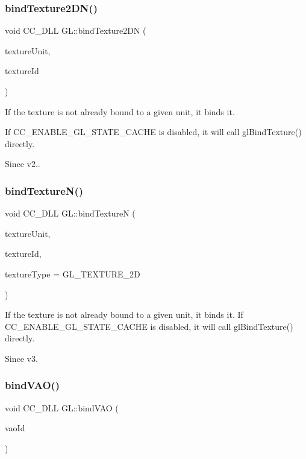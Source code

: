 \subsubsection{\texorpdfstring{bind\+Texture2\+D\+N()}{bindTexture2DN()}}
{\footnotesize\ttfamily void C\+C\+\_\+\+D\+LL G\+L\+::bind\+Texture2\+DN (\begin{DoxyParamCaption}\item[{G\+Luint}]{texture\+Unit,  }\item[{G\+Luint}]{texture\+Id }\end{DoxyParamCaption})}

If the texture is not already bound to a given unit, it binds it.

If C\+C\+\_\+\+E\+N\+A\+B\+L\+E\+\_\+\+G\+L\+\_\+\+S\+T\+A\+T\+E\+\_\+\+C\+A\+C\+HE is disabled, it will call gl\+Bind\+Texture() directly. \begin{DoxySince}{Since}
v2.. 
\end{DoxySince}
\mbox{\label{group__renderer_gac29040816c18820a701304e30ec5d88b}} 
\subsubsection{\texorpdfstring{bind\+Texture\+N()}{bindTextureN()}}
{\footnotesize\ttfamily void C\+C\+\_\+\+D\+LL G\+L\+::bind\+TextureN (\begin{DoxyParamCaption}\item[{G\+Luint}]{texture\+Unit,  }\item[{G\+Luint}]{texture\+Id,  }\item[{G\+Luint}]{texture\+Type = {\ttfamily GL\+\_\+TEXTURE\+\_\+2D} }\end{DoxyParamCaption})}

If the texture is not already bound to a given unit, it binds it. If C\+C\+\_\+\+E\+N\+A\+B\+L\+E\+\_\+\+G\+L\+\_\+\+S\+T\+A\+T\+E\+\_\+\+C\+A\+C\+HE is disabled, it will call gl\+Bind\+Texture() directly. \begin{DoxySince}{Since}
v3. 
\end{DoxySince}
\mbox{\label{group__renderer_gafecfbac8accd7b77a5367e8555bbaec4}} 
\subsubsection{\texorpdfstring{bind\+V\+A\+O()}{bindVAO()}}
{\footnotesize\ttfamily void C\+C\+\_\+\+D\+LL G\+L\+::bind\+V\+AO (\begin{DoxyParamCaption}\item[{G\+Luint}]{vao\+Id }\end{DoxyParamCaption})}

